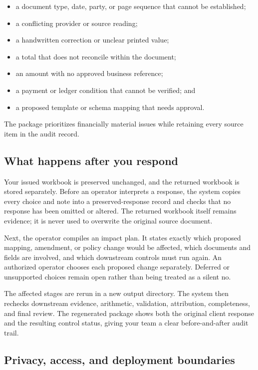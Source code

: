 \documentclass[
]{article}
\providecommand{\tightlist}{%
  \setlength{\itemsep}{0pt}\setlength{\parskip}{0pt}}
\begin{document}
\begin{itemize}
\tightlist
\item
  a document type, date, party, or page sequence that cannot be
  established;
\item
  a conflicting provider or source reading;
\item
  a handwritten correction or unclear printed value;
\item
  a total that does not reconcile within the document;
\item
  an amount with no approved business reference;
\item
  a payment or ledger condition that cannot be verified; and
\item
  a proposed template or schema mapping that needs approval.
\end{itemize}

The package prioritizes financially material issues while retaining
every source item in the audit record.

\subsection{What happens after you
respond}\label{what-happens-after-you-respond}

Your issued workbook is preserved unchanged, and the returned workbook
is stored separately. Before an operator interprets a response, the
system copies every choice and note into a preserved-response record and
checks that no response has been omitted or altered. The returned
workbook itself remains evidence; it is never used to overwrite the
original source document.

Next, the operator compiles an impact plan. It states exactly which
proposed mapping, amendment, or policy change would be affected, which
documents and fields are involved, and which downstream controls must
run again. An authorized operator chooses each proposed change
separately. Deferred or unsupported choices remain open rather than
being treated as a silent no.

The affected stages are rerun in a new output directory. The system then
rechecks downstream evidence, arithmetic, validation, attribution,
completeness, and final review. The regenerated package shows both the
original client response and the resulting control status, giving your
team a clear before-and-after audit trail.

\subsection{Privacy, access, and deployment
boundaries}\label{privacy-access-and-deployment-boundaries}
\end{document}
